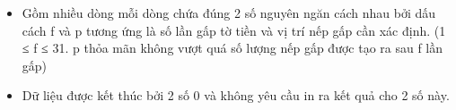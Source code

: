 \begin{itemize}
	\item     Gồm nhiều dòng mỗi dòng chứa đúng 2 số nguyên ngăn cách nhau bởi dấu cách f và p tương ứng là số lần gấp tờ tiền và vị trí nếp gấp cần xác định. (1 ≤ f ≤ 31. p thỏa mãn không vượt quá số lượng nếp gấp được tạo ra sau f lần gấp)   
	\item     Dữ liệu được kết thúc bởi 2 số 0 và không yêu cầu in ra kết quả cho 2 số này.   
\end{itemize}